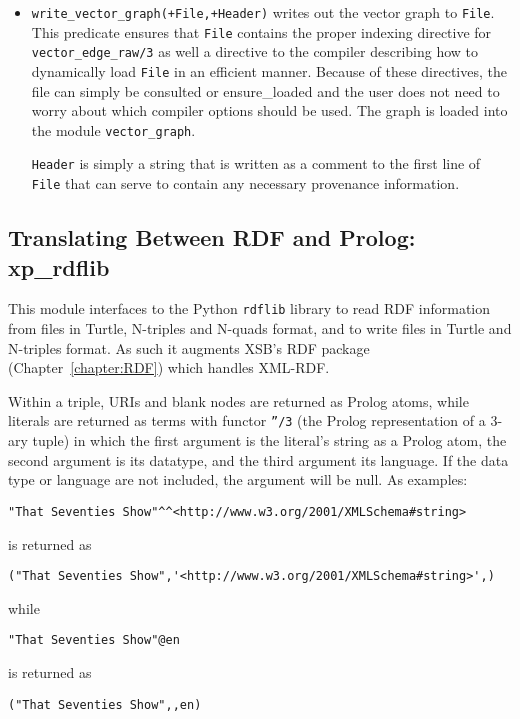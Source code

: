 \begin{itemize}
\item {\tt write\_vector\_graph(+File,+Header)} writes out the vector
  graph to {\tt File}.  This predicate ensures that {\tt File}
  contains the proper indexing directive for {\tt vector\_edge\_raw/3}
  as well a directive to the compiler describing how to dynamically
  load {\tt File} in an efficient manner.  Because of these
  directives, the file can simply be consulted or ensure\_loaded and
  the user does not need to worry about which compiler options should
  be used.  The graph is loaded into the module {\tt vector\_graph}.

  {\tt Header} is simply a string that is written as a comment to the
  first line of {\tt File} that can serve to contain any necessary
  provenance information.
\end{itemize}  

\subsection{Translating Between RDF and Prolog: xp\_rdflib} \label{secLxp-rdflib}
This module interfaces to the Python {\tt rdflib} library to read RDF
information from files in Turtle, N-triples and N-quads format, and to
write files in Turtle and N-triples format.  As such it augments XSB's
RDF package (Chapter~\ref{chapter:RDF}) which handles
XML-RDF.

Within a triple, URIs and blank nodes are returned as Prolog atoms,
while literals are returned as terms with functor {\tt ''/3} (the
Prolog representation of a 3-ary tuple) in which the first argument is
the literal's string as a Prolog atom, the second argument is its
datatype, and the third argument its language. If the data type or
language are not included, the argument will be null.  As examples:

\begin{verbatim}
"That Seventies Show"^^<http://www.w3.org/2001/XMLSchema#string> 
\end{verbatim}
is returned as 
\begin{verbatim}
("That Seventies Show",'<http://www.w3.org/2001/XMLSchema#string>',) 
\end{verbatim}
while 
\begin{verbatim}
"That Seventies Show"@en
\end{verbatim}
is returned as
\begin{verbatim}
("That Seventies Show",,en) 
\end{verbatim}

